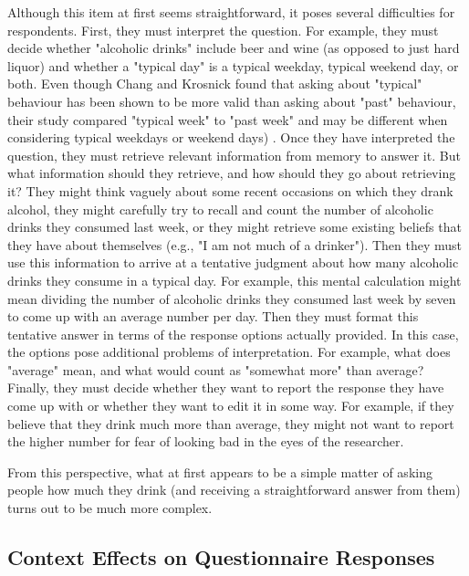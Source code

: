 Although this item at first seems straightforward, it poses several difficulties for respondents. First, they must interpret the question. For example, they must decide whether "alcoholic drinks" include beer and wine (as opposed to just hard liquor) and whether a "typical day" is a typical weekday, typical weekend day, or both. Even though Chang and Krosnick \citeyear{chang_3._2003} found that asking about "typical" behaviour has been shown to be more valid than asking about "past" behaviour, their study compared "typical week" to "past week" and may be different when considering typical weekdays or weekend days) . Once they have interpreted the question, they must retrieve relevant information from memory to answer it. But what information should they retrieve, and how should they go about retrieving it? They might think vaguely about some recent occasions on which they drank alcohol, they might carefully try to recall and count the number of alcoholic drinks they consumed last week, or they might retrieve some existing beliefs that they have about themselves (e.g., "I am not much of a drinker"). Then they must use this information to arrive at a tentative judgment about how many alcoholic drinks they consume in a typical day. For example, this mental calculation might mean dividing the number of alcoholic drinks they consumed last week by seven to come up with an average number per day. Then they must format this tentative answer in terms of the response options actually provided. In this case, the options pose additional problems of interpretation. For example, what does "average" mean, and what would count as "somewhat more" than average? Finally, they must decide whether they want to report the response they have come up with or whether they want to edit it in some way. For example, if they believe that they drink much more than average, they might not want to report the higher number for fear of looking bad in the eyes of the researcher.

From this perspective, what at first appears to be a simple matter of asking people how much they drink (and receiving a straightforward answer from them) turns out to be much more complex.

\subsection{Context Effects on Questionnaire Responses}


